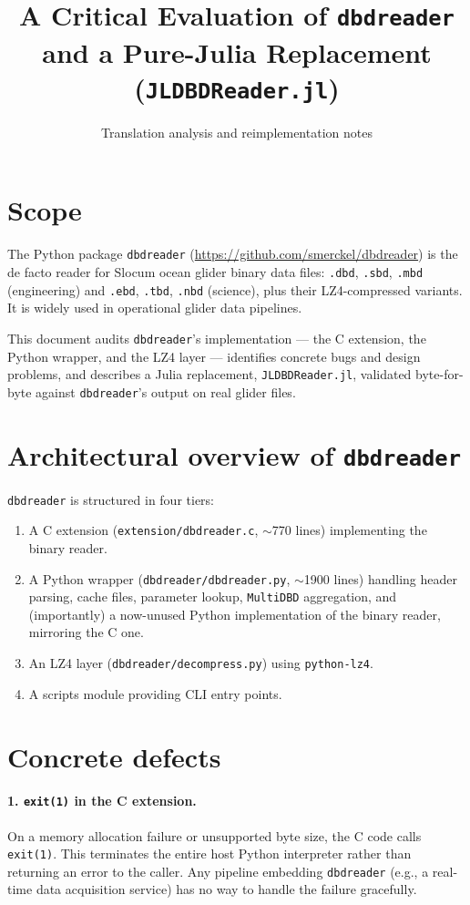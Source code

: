 \documentclass[11pt]{article}
\title{A Critical Evaluation of \texttt{dbdreader} \\
       \large and a Pure-Julia Replacement (\texttt{JLDBDReader.jl})}
\author{Translation analysis and reimplementation notes}
\date{}
\begin{document}
\maketitle

\section{Scope}

The Python package \texttt{dbdreader}
(\url{https://github.com/smerckel/dbdreader}) is the de facto reader for
Slocum ocean glider binary data files: \texttt{.dbd},
\texttt{.sbd}, \texttt{.mbd} (engineering) and \texttt{.ebd}, \texttt{.tbd},
\texttt{.nbd} (science), plus their LZ4-compressed variants.  It is widely
used in operational glider data pipelines.

This document audits \texttt{dbdreader}'s implementation — the C
extension, the Python wrapper, and the LZ4 layer — identifies concrete
bugs and design problems, and describes a Julia replacement,
\texttt{JLDBDReader.jl}, validated byte-for-byte against \texttt{dbdreader}'s
output on real glider files.

\section{Architectural overview of \texttt{dbdreader}}

\texttt{dbdreader} is structured in four tiers:
\begin{enumerate}[leftmargin=*,topsep=1pt,itemsep=0pt]
  \item A C extension (\texttt{extension/dbdreader.c}, $\sim$770 lines)
        implementing the binary reader.
  \item A Python wrapper (\texttt{dbdreader/dbdreader.py}, $\sim$1900 lines)
        handling header parsing, cache files, parameter lookup,
        \texttt{MultiDBD} aggregation, and (importantly) a now-unused
        Python implementation of the binary reader, mirroring the C one.
  \item An LZ4 layer (\texttt{dbdreader/decompress.py}) using \texttt{python-lz4}.
  \item A scripts module providing CLI entry points.
\end{enumerate}

\section{Concrete defects}

\paragraph{1. \texttt{exit(1)} in the C extension.}
On a memory allocation failure or unsupported byte size, the C code calls
\texttt{exit(1)}.  This terminates the entire host Python interpreter
rather than returning an error to the caller.  Any pipeline embedding
\texttt{dbdreader} (e.g., a real-time data acquisition service) has no way
to handle the failure gracefully.
\end{document}
